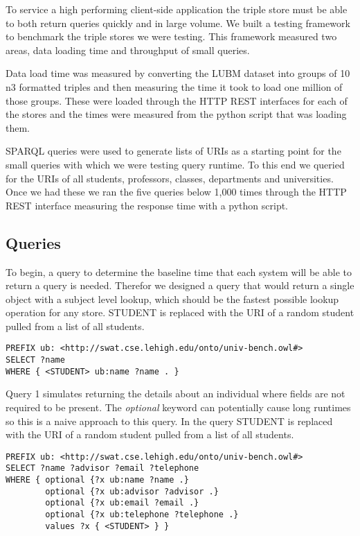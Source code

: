 \documentclass{llncs}
\begin{document}
To service a high performing client-side application the triple store must be able to both return queries quickly and in large volume.  We built a testing framework to benchmark the triple stores we were testing.  This framework measured two areas, data loading time and throughput of small queries.

Data load time was measured by converting the LUBM dataset into groups of 10 n3 formatted triples and then measuring the time it took to load one million of those groups.  These were loaded through the HTTP REST interfaces for each of the stores and the times were measured from the python script that was loading them.

SPARQL queries were used to generate lists of URIs as a starting point for the small queries with which we were testing query runtime.  To this end we queried for the URIs of all students, professors, classes, departments and universities.  Once we had these we ran the five queries below 1,000 times through the HTTP REST interface measuring the response time with a python script.

\subsection{Queries}
To begin, a query to determine the baseline time that each system will be able to return a query is needed.  Therefor we designed a query that would return a single object with a subject level lookup, which should be the fastest possible lookup operation for any store.  STUDENT is replaced with the URI of a random student pulled from a list of all students.

\begin{lstlisting}[caption=Benchmark Query]
PREFIX ub: <http://swat.cse.lehigh.edu/onto/univ-bench.owl#>
SELECT ?name
WHERE { <STUDENT> ub:name ?name . }
\end{lstlisting}

\smallskip

Query 1 simulates returning the details about an individual where fields are not required to be present.  The \emph{optional} keyword can potentially cause long runtimes so this is a naive approach to this query.  In the query STUDENT is replaced with the URI of a random student pulled from a list of all students.

\begin{lstlisting}[caption=Query 1]
PREFIX ub: <http://swat.cse.lehigh.edu/onto/univ-bench.owl#>
SELECT ?name ?advisor ?email ?telephone
WHERE { optional {?x ub:name ?name .}
        optional {?x ub:advisor ?advisor .}
        optional {?x ub:email ?email .}
        optional {?x ub:telephone ?telephone .}
        values ?x { <STUDENT> } }
\end{lstlisting}
\end{document}

